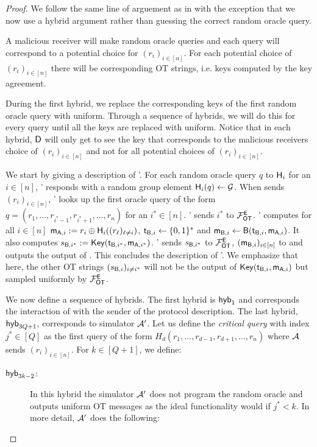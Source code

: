 \begin{proof}
We follow the same line of arguement as in  with the exception that we now use a hybrid argument rather than guessing the correct random oracle query. 

A malicious receiver will make random oracle queries and each query will correspond to a potential choice for $(r_i)_{i\in[n]}$. For each potential choice of $(r_i)_{i\in[n]}$ there will be corresponding OT strings, i.e. keys computed by the key agreement.
 
During the first hybrid, we replace the corresponding keys of the first random oracle query with uniform. Through a sequence of hybrids, we will do this for every query until all the keys are replaced with uniform. Notice that in each hybrid, $\mathsf D$ will only get to see the key that corresponds to the malicious receivers choice of $(r_i)_{i\in[n]}$ and not for all potential choices of $(r_i)_{i\in[n]}$.


We start by giving a description of \Adv'. For each random oracle query $q$ to $\mathsf{H}_i$ for an $i\in[n]$, \Adv' responds with a random group element $\mathsf{H}_i(q)\leftarrow\mathcal{G}$.
 When \Adv sends $(r_i)_{i\in[n]}$, \Adv' looks up the first oracle query of the form $q= (r_1,\dots, r_{i^*-1},r_{i^*+1},\dots, r_{n})$ for an $i^*\in[n]$. \Adv' sends $i^*$ to $\mathcal{F}_{\mathsf{OT}}^\mathsf{E}$. \Adv' computes for all $i\in[n]$ $\mathsf{m}_{\mathsf{A},i}:=r_i\oplus\mathsf{H}_i((r_\ell)_{\ell\neq i})$, $\mathsf{t}_{\mathsf{B},i}\leftarrow\{0,1\}^*$ and $\mathsf{m}_{\mathsf{B},i}\leftarrow\mathsf{B}(\mathsf{t}_{\mathsf{B},i},\mathsf{m}_{\mathsf{A},i})$. It also computes $s_{\mathsf{B},i^*}:=\mathsf{Key}(\mathsf{t}_{\mathsf{B},i^*},\mathsf{m}_{\mathsf{A},i^*})$.
\Adv' sends $s_{\mathsf{B},i^*}$ to $\mathcal{F}_{\mathsf{OT}}^\mathsf{E}$, $(\mathsf{m}_{\mathsf{B},i})_{i\in[n]}$ to \Adv and outputs the output of \Adv. This concludes the description of \Adv'. We emphasize that here, the other OT strings $(s_{\mathsf{B},i})_{i\neq i^*}$ will not be the output of $\mathsf{Key}(\mathsf{t}_{\mathsf{B},i},\mathsf{m}_{\mathsf{A},i})$ but sampled uniformly by $\mathcal{F}_{\mathsf{OT}}^\mathsf{E}$.

We now define a sequence of hybrids. The first hybrid is $\mathsf{hyb}_1$ and corresponds the interaction of \Adv with the sender of the protocol description. The last hybrid, $\mathsf{hyb}_{3Q+1}$, corresponds to simulator $\mathcal{A}'$. Let us define the \emph{critical query} with index $j^*\in[Q]$ as the first query of the form $H_d(r_1,\dots, r_{d-1},r_{d+1},\dots, r_{n})$ where $\mathcal{A}$ sends $(r_i)_{i\in[n]}$. 
For $k\in[Q+1]$, we define:
\begin{description}
\item[$\mathsf{hyb}_{3k-2}$:] In this hybrid the simulator $\mathcal{A}'$ does not program the random oracle and outputs uniform OT messages as the ideal functionality would if $j^*<k$. In more detail,  $\mathcal{A}'$ does the following:


\end{description}
\end{proof}
